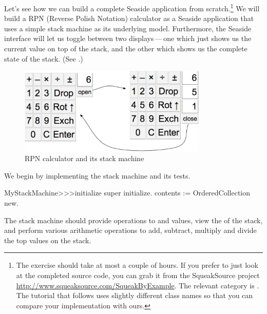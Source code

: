 \documentclass[a4paper,10pt,twoside]{book}
\begin{document}

Let's see how we can build a complete Seaside application from scratch.\footnote{The exercise should take at most a couple of hours. If you prefer to just look at the completed source code, you can grab it from the SqueakSource project \url{http://www.squeaksource.com/SqueakByExample}.
The relevant category is . The tutorial that follows uses slightly different class names so that you can compare your implementation with ours.}
We will build a RPN (Reverse Polish Notation) calculator as a Seaside application that uses a simple stack machine as its underlying model.
Furthermore, the Seaside interface will let us toggle between two displays\,---\,one which just shows us the current value on top of the stack, and the other which shows us the complete state of the stack.
(See .)

\begin{figure}[ht]
\begin{center}
\includegraphics[width=0.8\textwidth]{stackMachine}
\caption{RPN calculator and its stack machine}
\label{fig:stackMachine}
\end{center}
\end{figure}

We begin by implementing the stack machine and its tests.


\begin{code}{}
MyStackMachine>>>initialize
	super initialize.
	contents := OrderedCollection new.
\end{code}

The stack machine should provide operations to  and  values, view the  of the stack, and perform various arithmetic operations to add, subtract, multiply and divide the top values on the stack.
\end{document}
